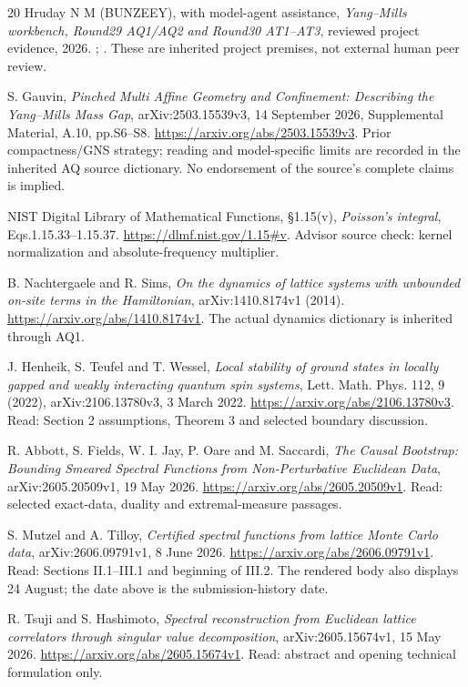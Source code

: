 \begin{thebibliography}{20}
\small
{}
Hruday N M (BUNZEEY), with model-agent assistance,
\emph{Yang--Mills workbench, Round29 AQ1/AQ2 and Round30 AT1--AT3},
reviewed project evidence, 2026.
;
.
These are inherited project premises, not external human peer review.

S. Gauvin, \emph{Pinched Multi Affine Geometry and Confinement:
Describing the Yang--Mills Mass Gap}, arXiv:2503.15539v3,
14 September 2026, Supplemental Material, A.10, pp.S6--S8.
\url{https://arxiv.org/abs/2503.15539v3}.
Prior compactness/GNS strategy; reading and model-specific limits are recorded
in the inherited AQ source dictionary. No endorsement of the source's complete
claims is implied.

NIST Digital Library of Mathematical Functions,
\S1.15(v), \emph{Poisson's integral}, Eqs.1.15.33--1.15.37.
\url{https://dlmf.nist.gov/1.15#v}.
Advisor source check: kernel normalization and absolute-frequency multiplier.

B. Nachtergaele and R. Sims,
\emph{On the dynamics of lattice systems with unbounded on-site terms in the Hamiltonian},
arXiv:1410.8174v1 (2014).
\url{https://arxiv.org/abs/1410.8174v1}.
The actual dynamics dictionary is inherited through AQ1.

J. Henheik, S. Teufel and T. Wessel,
\emph{Local stability of ground states in locally gapped and weakly interacting quantum spin systems},
Lett. Math. Phys. 112, 9 (2022), arXiv:2106.13780v3, 3 March 2022.
\url{https://arxiv.org/abs/2106.13780v3}.
Read: Section 2 assumptions, Theorem 3 and selected boundary discussion.

R. Abbott, S. Fields, W. I. Jay, P. Oare and M. Saccardi,
\emph{The Causal Bootstrap: Bounding Smeared Spectral Functions from Non-Perturbative Euclidean Data},
arXiv:2605.20509v1, 19 May 2026.
\url{https://arxiv.org/abs/2605.20509v1}.
Read: selected exact-data, duality and extremal-measure passages.

S. Mutzel and A. Tilloy,
\emph{Certified spectral functions from lattice Monte Carlo data},
arXiv:2606.09791v1, 8 June 2026.
\url{https://arxiv.org/abs/2606.09791v1}.
Read: Sections II.1--III.1 and beginning of III.2.
The rendered body also displays 24 August; the date above is the submission-history date.

R. Tsuji and S. Hashimoto,
\emph{Spectral reconstruction from Euclidean lattice correlators through singular value decomposition},
arXiv:2605.15674v1, 15 May 2026.
\url{https://arxiv.org/abs/2605.15674v1}.
Read: abstract and opening technical formulation only.


\end{thebibliography}

